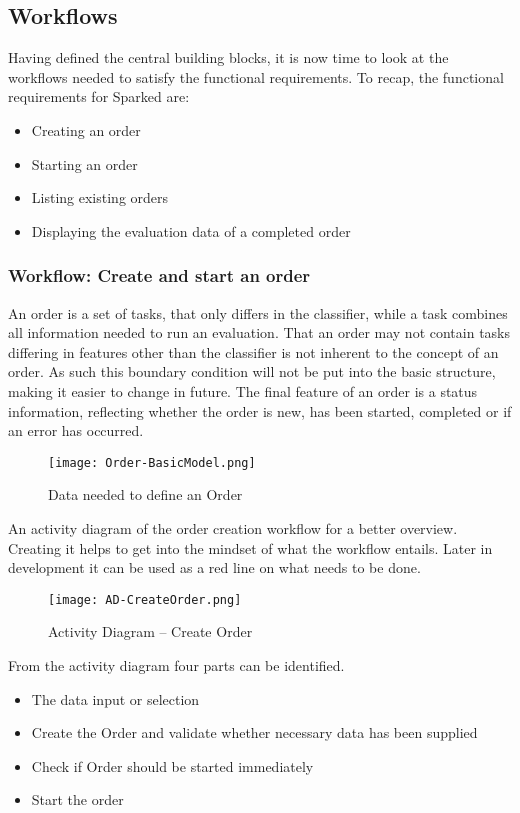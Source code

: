 \subsection{Workflows}
Having defined the central building blocks, it is now time to look at the workflows needed to satisfy the functional requirements. To recap, the functional requirements for Sparked are:
\begin{itemize}
\item Creating an order
\item Starting an order
\item Listing existing orders
\item Displaying the evaluation data of a completed order
\end{itemize}

\subsubsection{Workflow: Create and start an order}
An order is a set of tasks, that only differs in the classifier, while a task combines all information needed to run an evaluation. That an order may not contain tasks differing in features other than the classifier is not inherent to the concept of an order. As such this boundary condition will not be put into the basic structure, making it easier to change in future. 
The final feature of an order is a status information, reflecting whether the order is new, has been started, completed or if an error has occurred.
 
\begin{figure}
	\texttt{[image: Order-BasicModel.png]}
	\caption{Data needed to define an Order}
\end{figure}

An activity diagram of the order creation workflow for a better overview. Creating it helps to get into the mindset of what the workflow entails. Later in development it can be used as a red line on what needs to be done.
 
\begin{figure}
	\texttt{[image: AD-CreateOrder.png]}
	\caption{Activity Diagram – Create Order}
\end{figure}

From the activity diagram four parts can be identified.
\begin{itemize} 
\item The data input or selection
\item Create the Order and validate whether necessary data has been supplied
\item Check if Order should be started immediately
\item Start the order
\end{itemize}

